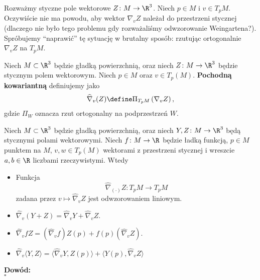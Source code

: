 \begin{frame}
 Rozważmy styczne pole wektorowe $Z\colon M\to \R^3$. Niech $p\in M$ i $v\in T_p M$. Oczywiście nie ma powodu, aby wektor $\nabla_v Z$ należał do przestrzeni stycznej (dlaczego nie było tego problemu gdy rozważaliśmy odwzorowanie Weingartena?). \pause Spróbujemy ``naprawić'' tę sytuację w brutalny sposób: rzutując ortogonalnie $\nabla_v Z$ na $T_p M$. %

\pause
 \begin{definicja}
 Niech $M\subset \R^3$ będzie gładką powierzchnią, oraz niech $Z\colon M\to \R^3$ będzie stycznym polem wektorowym. Niech $p\in M$ oraz $v\in T_p(M)$. \textbf{Pochodną kowariantną} definiujemy jako
 \[\widehat\nabla_v(Z)\define\Pi_{T_pM}\left(\nabla_vZ\right),\]gdzie $\Pi_W$ oznacza rzut ortogonalny na podprzestrzeń $W$.
 \end{definicja}
 \end{frame}
\begin{frame}

\begin{lemat}
  Niech $M\subset \R^3$ będzie gładką powierzchnią, oraz niech $Y, Z\colon M\to \R^3$ będą stycznymi polami wektorowymi. Niech $f\colon M\to \R$ będzie ładką funkcją, $p\in M$ punktem na $M$, $v,w\in T_p(M)$ wektorami z przestrzeni stycznej i wreszcie $a,b\in \R$ liczbami rzeczywistymi. Wtedy
 \begin{itemize}
  \item Funkcja \[\widehat{\nabla}_{(\cdot)}Z\colon T_pM\to T_pM\] zadana przez $v\mapsto \widehat{\nabla}_vZ$ jest odwzorowaniem liniowym.
  \item $\widehat{\nabla}_v(Y+Z)=\widehat{\nabla}_vY+\widehat{\nabla}_v Z$.
  \item $\widehat{\nabla}_vfZ=(\widehat{\nabla}_v f)Z(p)+f(p)(\widehat{\nabla}_vZ)$.
 \item $\widehat{\nabla}_v\langle Y,Z\rangle=\langle\widehat{\nabla}_v Y, Z(p)\rangle+\langle Y(p),\widehat{\nabla}_v Z\rangle$
\end{itemize}
\end{lemat}

\pause \textcolor{ared}{\textbf{Dowód:}}\\
\hfill $\square$
\end{frame}
